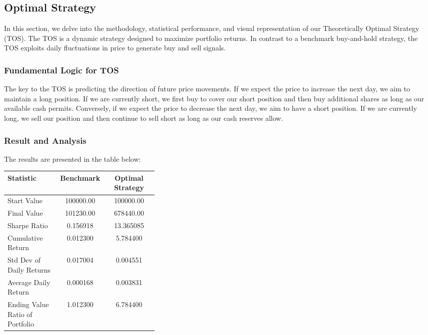 \documentclass[
	letterpaper, %
]{jdf}
\begin{document}
\subsection{Optimal Strategy}
In this section, we delve into the methodology, statistical performance, and visual representation of our Theoretically Optimal Strategy (TOS). The TOS is a dynamic strategy designed to maximize portfolio returns. In contrast to a benchmark buy-and-hold strategy, the TOS exploits daily fluctuations in price to generate buy and sell signals. 

\subsubsection{Fundamental Logic for TOS}
The key to the TOS is predicting the direction of future price movements. If we expect the price to increase the next day, we aim to maintain a long position. If we are currently short, we first buy to cover our short position and then buy additional shares as long as our available cash permits. Conversely, if we expect the price to decrease the next day, we aim to have a short position. If we are currently long, we sell our position and then continue to sell short as long as our cash reserves allow.

\subsubsection{Result and Analysis}

The results are presented in the table below:

\begin{jdftable}
\small %
\label{table:performance_metrics}
\begin{tabular}{@{} L{0.35\linewidth} S S}
\textbf{Statistic} & \textbf{Benchmark} & \textbf{Optimal Strategy} \\
\toprule[0.5pt]
Start Value & 100000.00 & 100000.00 \\
\midrule
Final Value & 101230.00 & 678440.00 \\
\midrule
Sharpe Ratio & 0.156918 & 13.365085 \\
\midrule
Cumulative Return & 0.012300 & 5.784400 \\
\midrule
Std Dev of Daily Returns & 0.017004 & 0.004551 \\
\midrule
Average Daily Return & 0.000168 & 0.003831 \\
\midrule
Ending Value Ratio of Portfolio & 1.012300 & 6.784400 \\
\bottomrule[0.5pt]
\end{tabular}
\end{jdftable}
\end{document}
